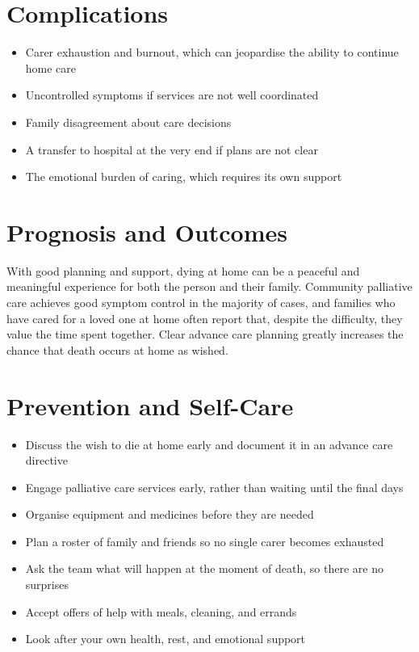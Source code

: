 \section*{Complications}
\begin{itemize}
    \item Carer exhaustion and burnout, which can jeopardise the ability to continue home care
    \item Uncontrolled symptoms if services are not well coordinated
    \item Family disagreement about care decisions
    \item A transfer to hospital at the very end if plans are not clear
    \item The emotional burden of caring, which requires its own support
\end{itemize}

\section*{Prognosis and Outcomes}
With good planning and support, dying at home can be a peaceful and meaningful experience for both the person and their family. Community palliative care achieves good symptom control in the majority of cases, and families who have cared for a loved one at home often report that, despite the difficulty, they value the time spent together. Clear advance care planning greatly increases the chance that death occurs at home as wished.

\section*{Prevention and Self-Care}
\begin{itemize}
    \item Discuss the wish to die at home early and document it in an advance care directive
    \item Engage palliative care services early, rather than waiting until the final days
    \item Organise equipment and medicines before they are needed
    \item Plan a roster of family and friends so no single carer becomes exhausted
    \item Ask the team what will happen at the moment of death, so there are no surprises
    \item Accept offers of help with meals, cleaning, and errands
    \item Look after your own health, rest, and emotional support
\end{itemize}

